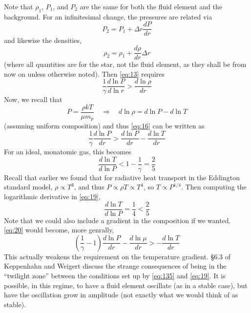 \documentclass[10pt]{article}
\numberwithin{equation}{section}
\begin{document}
Note that $\rho_1$, $P_1$, and $P_2$ are the same for both the fluid
element and the background. For an infinitesimal change, the pressures
are related via
\begin{equation}
  \label{eq:14}
  P_2=P_1+\Delta r\frac{dP}{dr}
\end{equation}
and likewise the densities, 
\begin{equation}
  \label{eq:15}
  \rho_2=\rho_1+\frac{d\rho}{dr}\Delta r
\end{equation}
(where all quantities are for the star, not the fluid element, as they
shall be from now on unless otherwise noted). Then \eqref{eq:13} requires
\begin{equation}
  \label{eq:16}
  \frac{1}{\gamma}\frac{d\ln P}{d\ln r}>\frac{d\ln\rho}{dr}
\end{equation}
Now, we recall that
\begin{equation}
  \label{eq:17}
  P=\frac{\rho kT}{\mu m_p} \quad\Rightarrow \quad d\ln\rho=d\ln
  P-d\ln T
\end{equation}
(assuming uniform composition) and thus \eqref{eq:16} can be written as
\begin{equation}
  \label{eq:18}
  \frac{1}{\gamma}\frac{d\ln P}{dr}>\frac{d\ln P}{dr}-\frac{d\ln T}{dr}
\end{equation}
For an ideal, monatomic gas, this becomes
\begin{equation}
  \label{eq:19}
  \frac{d\ln T}{d\ln P}<1-\frac{1}{\gamma}=\frac{2}{5}
\end{equation}
Recall that earlier we found that for radiative heat transport in the
Eddington standard model,
$\rho\propto T^3$, and thus $P\propto \rho T\propto T^4$, so
$T\propto P^{1/4}$. Then computing the logarithmic derivative in
\eqref{eq:19}, 
\begin{equation}
  \label{eq:20}
  \frac{d\ln T}{d\ln P}=\frac{1}{4}<\frac{2}{5}
\end{equation}
Note that we could also include a gradient in the composition if we
wanted. \eqref{eq:20} would become, more genrally,
\begin{equation}
  \label{eq:135}
  \boxed{\left(\frac{1}{\gamma}-1\right)\frac{d\ln
    P}{dr}-\frac{d\ln\mu}{dr}>-\frac{d\ln T}{dr}}
\end{equation}
This actually weakens the requirement on the temperature
gradient. \S6.3 of Keppenhahn and Weigert discuss the strange
consequences of being in the ``twilight zone'' between the conditions
set up by \eqref{eq:135} and \eqref{eq:19}. It is possible, in this
regime, to have a fluid element oscillate (as in a stable case), but
have the oscillation grow in amplitude (not exactly what we would
think of as stable).\\
\end{document}

